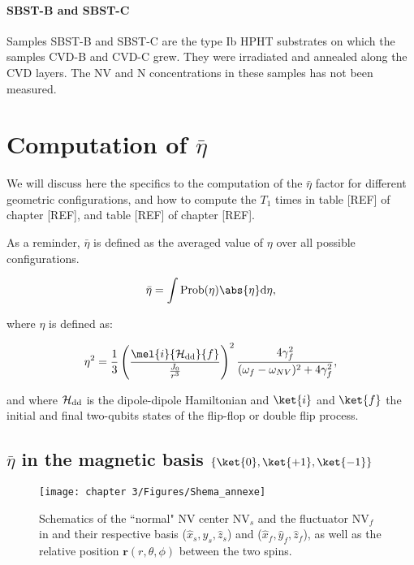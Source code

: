 \documentclass[a4paper, 11pt]{book}
\begin{document}
\subsubsection{SBST-B and SBST-C}
Samples SBST-B and SBST-C are the type Ib HPHT substrates on which the samples CVD-B and CVD-C grew. They were irradiated and annealed along the CVD layers. The NV and N concentrations in these samples has not been measured.

\chapter{Computation of $\bar \eta$}
\label{Appendix eta}
We will discuss here the specifics to the computation of the  $\bar \eta$ factor for different geometric configurations, and how to compute the $T_1$ times in table [REF] of chapter [REF], and table [REF] of chapter [REF].

As a reminder, $\bar \eta$ is defined as the averaged value of $\eta$ over all possible configurations.

\begin{equation}
\bar \eta = \int \rm{Prob}(\eta) \abs{\eta} d\eta,
\end{equation}

where $\eta$ is defined as:

\begin{equation}
\label{eq. eta debut annexe}
\eta^2=\frac{1}{3} \left(\frac{\mel{i}{\mathcal{H_{\rm dd}}}{f}}{\frac{J_0}{r^3}}\right)^2 \frac{4\gamma_f^2}{(\omega_f - \omega_{NV})^2+4\gamma_f^2},
\end{equation}

and where $\mathcal{H_{\rm dd}}$ is the dipole-dipole Hamiltonian and $\ket{i}$ and $\ket{f}$ the initial and final two-qubits states of the flip-flop or double flip process.

\section{$\bar \eta$ in the magnetic basis $\{ \ket{0}, \ket{+1}, \ket{-1}\}$}

\begin{figure}[h]
\centering
\texttt{[image: chapter 3/Figures/Shema\_annexe]}
\caption{Schematics of the ``normal" NV center NV$_s$ and the fluctuator NV$_f$ in and their respective basis ($\hat x_s,\hat y_s,\hat z_s$) and ($\hat x_f,\hat y_f,\hat z_f$), as well as the relative position $\mathbf{r}(r,\theta,\phi)$ between the two spins.}
\label{shema spins annexe}
\end{figure}
\end{document}
